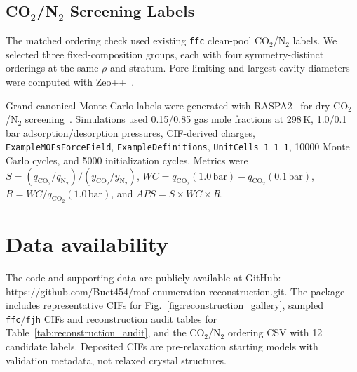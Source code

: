 \documentclass[pdflatex,sn-mathphys-num]{sn-jnl}
\theoremstyle{thmstyleone}%
\begin{document}
\subsection*{CO$_2$/N$_2$ Screening Labels}
The matched ordering check used existing \texttt{ffc} clean-pool CO$_2$/N$_2$ labels. We selected three fixed-composition groups, each with four symmetry-distinct orderings at the same $\rho$ and stratum. Pore-limiting and largest-cavity diameters were computed with Zeo++~\cite{willems2012algorithms}.

Grand canonical Monte Carlo labels were generated with RASPA2~\cite{dubbeldam2016raspa} for dry CO$_2$/N$_2$ screening~\cite{altintas2018database}. Simulations used 0.15/0.85 gas mole fractions at 298\,K, 1.0/0.1\,bar adsorption/desorption pressures, CIF-derived charges, \texttt{ExampleMOFsForceField}, \texttt{ExampleDefinitions}, \texttt{UnitCells 1 1 1}, 10000 Monte Carlo cycles, and 5000 initialization cycles. Metrics were $S=(q_{\mathrm{CO_2}}/q_{\mathrm{N_2}})/(y_{\mathrm{CO_2}}/y_{\mathrm{N_2}})$, $WC=q_{\mathrm{CO_2}}(1.0\,\mathrm{bar})-q_{\mathrm{CO_2}}(0.1\,\mathrm{bar})$, $R=WC/q_{\mathrm{CO_2}}(1.0\,\mathrm{bar})$, and $APS=S\times WC\times R$.

\section*{Data availability}
The code and supporting data are publicly available at GitHub: https://github.com/Buct454/mof-enumeration-reconstruction.git. The package includes representative CIFs for Fig.~\ref{fig:reconstruction_gallery}, sampled \texttt{ffc}/\texttt{fjh} CIFs and reconstruction audit tables for Table~\ref{tab:reconstruction_audit}, and the CO$_2$/N$_2$ ordering CSV with 12 candidate labels. Deposited CIFs are pre-relaxation starting models with validation metadata, not relaxed crystal structures.
\end{document}
